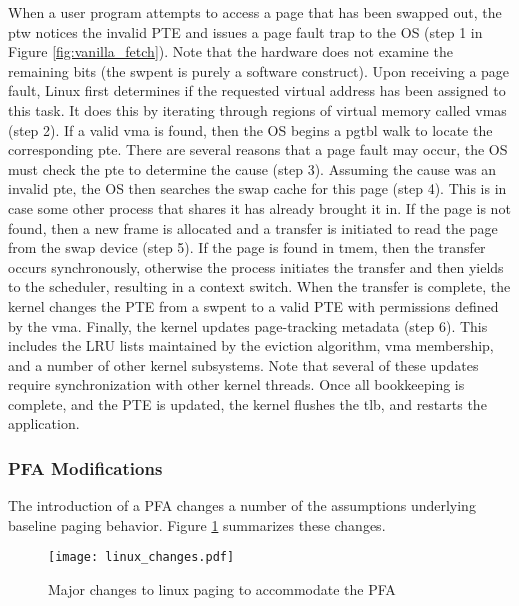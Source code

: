 When a user program attempts to access a page that has been swapped out, the
\gls{ptw} notices the invalid PTE and issues a page fault trap to the OS (step
1 in Figure \ref{fig:vanilla_fetch}). Note that the hardware does not examine
the remaining bits (the \gls{swpent} is purely a software construct). Upon
receiving a page fault, Linux first determines if the requested virtual address
has been assigned to this task. It does this by iterating through regions of
virtual memory called \glspl{vma} (step 2). If a valid \gls{vma} is found, then
the OS begins a \gls{pgtbl} walk to locate the corresponding \gls{pte}. There
are several reasons that a page fault may occur, the OS must check the
\gls{pte} to determine the cause (step 3). Assuming the cause was an invalid
\gls{pte}, the OS then searches the swap cache for this page (step 4). This is
in case some other process that shares it has already brought it in. If the
page is not found, then a new frame is allocated and a transfer is initiated to
read the page from the swap device (step 5). If the page is found in
\gls{tmem}, then the transfer occurs synchronously, otherwise the process
initiates the transfer and then yields to the scheduler, resulting in a context
switch. When the transfer is complete, the kernel changes the PTE from a
\gls{swpent} to a valid PTE with permissions defined by the \gls{vma}. Finally,
the kernel updates page-tracking metadata (step 6). This includes the LRU lists
maintained by the eviction algorithm, \gls{vma} membership, and a number of
other kernel subsystems. Note that several of these updates require
synchronization with other kernel threads. Once all bookkeeping is complete,
and the PTE is updated, the kernel flushes the \gls{tlb}, and restarts the
application.

\FloatBarrier 
\subsubsection{PFA Modifications}
The introduction of a PFA changes a number of the assumptions underlying
baseline paging behavior. Figure \ref{fig:linux_changes} summarizes these
changes.

\begin{figure}[h] \centering
  \texttt{[image: linux\_changes.pdf]}
  \caption{Major changes to linux paging to accommodate the PFA}
  \label{fig:linux_changes}
\end{figure}

